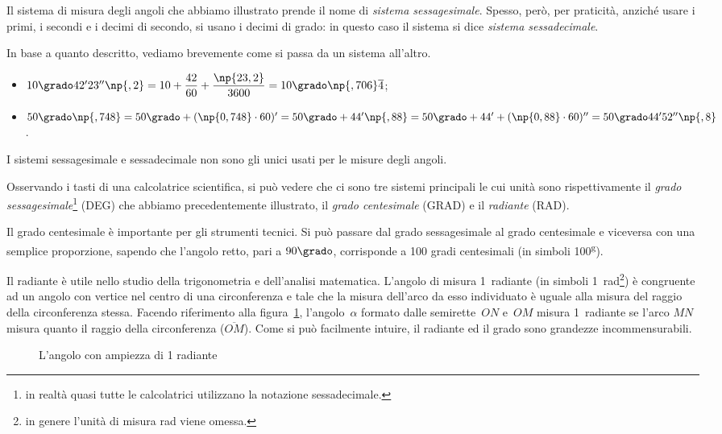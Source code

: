Il sistema di misura degli angoli che abbiamo illustrato prende il 
nome di \emph{sistema sessagesimale}. Spesso, però, per praticità, 
anziché usare i primi, i secondi e i decimi di secondo, si usano i 
decimi di grado: in questo caso il sistema si dice \emph{sistema 
sessadecimale}.

In base a quanto descritto, vediamo brevemente come si passa da un 
sistema all'altro.

\begin{itemize}
\item $10\grado 42' 23''\np{,2} = 
10+\dfrac{42}{60}+\dfrac{\np{23,2}}{3600} = 
10\grado\np{,706}\overline{4}$;
\item $50\grado\np{,748} = 50\grado + (\np{0,748}\cdot 60)'=50\grado 
+ 44'\np{,88} = 50\grado + 44'+(\np{0,88}\cdot 60)'' = 50\grado 44' 
52''\np{,8}$.
\end{itemize}

I sistemi sessagesimale e sessadecimale non sono gli unici usati per 
le misure degli angoli.

Osservando i tasti di una calcolatrice scientifica, si può vedere che 
ci sono tre sistemi principali le cui unità sono rispettivamente il 
\emph{grado sessagesimale}\footnote{in realtà quasi tutte le 
calcolatrici utilizzano la notazione sessadecimale.} (DEG) che 
abbiamo precedentemente illustrato, il \emph{grado centesimale} 
(GRAD) e il \emph{radiante} (RAD).

Il grado centesimale è importante per gli strumenti tecnici. Si può 
passare dal grado sessagesimale al grado centesimale e viceversa con 
una semplice proporzione, sapendo che l'angolo retto, pari a 
$90\grado$, corrisponde a 100 gradi centesimali (in simboli 
100\textsuperscript{g}).

Il radiante è utile nello studio della trigonometria e dell'analisi 
matematica. L'angolo di misura 1~radiante (in simboli 
1~rad\footnote{in genere l'unità di misura rad viene omessa.}) è 
congruente ad un angolo con vertice nel centro di una circonferenza e 
tale che la misura dell'arco da esso individuato è uguale alla misura 
del raggio della circonferenza stessa.
Facendo riferimento alla figura~\ref{fig:radiante}, l'angolo~$\alpha$ 
formato dalle semirette~$ON$ e~$OM$ misura 1~radiante se l'arco $MN$ 
misura quanto il raggio della circonferenza ($\overline{OM}$). Come 
si può facilmente intuire, il radiante ed il grado sono grandezze 
incommensurabili.


\begin{inaccessibleblock}
 \begin{figure}[htb]
\centering
\caption{L'angolo con ampiezza di 1 radiante}\label{fig:radiante}
\end{figure}
\end{inaccessibleblock}

